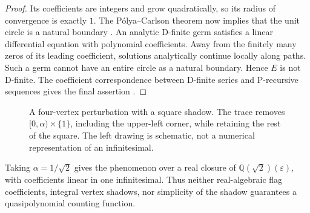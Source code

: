 \documentclass[11pt,a4paper]{article}
\numberwithin{equation}{section}
\theoremstyle{plain}
\newcommand{\Q}{\mathbb Q}
\newcommand{\eps}{\varepsilon}
\begin{document}
\begin{proof}
Its coefficients are integers and grow quadratically, so its radius of
convergence is exactly $1$. The P\'olya--Carlson theorem now implies that
the unit circle is a natural boundary \cite[Theorem 1.1]{ehr:bell-et-al}.
An analytic D-finite germ satisfies a linear differential equation with
polynomial coefficients. Away from the finitely many zeros of its leading
coefficient, solutions analytically continue locally along paths. Such a
germ cannot have an entire circle as a natural boundary. Hence $E$ is not
D-finite. The coefficient correspondence between D-finite series and
P-recursive sequences gives the final assertion \cite{ehr:stanley-dfinite}.
\end{proof}

\begin{figure}[htbp]
\centering
{}
\caption{A four-vertex perturbation with a square shadow. The trace removes
$[0,\alpha)\times\{1\}$, including the upper-left corner, while retaining
the rest of the square. The left drawing is schematic, not a numerical
representation of an infinitesimal.}
\label{poly:ehr:fig:quad}
\end{figure}

\begin{corollary}\label{poly:ehr:cor:algebraic}
Taking $\alpha=1/\sqrt2$ gives the phenomenon over a real closure of
$\Q(\sqrt2)(\eps)$, with coefficients linear in one infinitesimal.
Thus neither real-algebraic flag coefficients, integral vertex shadows,
nor simplicity of the shadow guarantees a quasipolynomial counting function.
\end{corollary}
\end{document}
